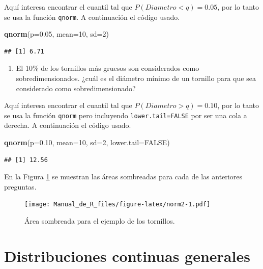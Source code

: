 \documentclass[10pt,]{krantz}
\makeatletter
\newenvironment{Shaded}{\begin{snugshade}}{\end{snugshade}}
\newcommand{\KeywordTok}[1]{\textcolor[rgb]{0.13,0.29,0.53}{\textbf{{#1}}}}
\newcommand{\DataTypeTok}[1]{\textcolor[rgb]{0.13,0.29,0.53}{{#1}}}
\newcommand{\DecValTok}[1]{\textcolor[rgb]{0.00,0.00,0.81}{{#1}}}
\newcommand{\FloatTok}[1]{\textcolor[rgb]{0.00,0.00,0.81}{{#1}}}
\newcommand{\OtherTok}[1]{\textcolor[rgb]{0.56,0.35,0.01}{{#1}}}
\newcommand{\NormalTok}[1]{{#1}}
\providecommand{\tightlist}{%
  \setlength{\itemsep}{0pt}\setlength{\parskip}{0pt}}
\newenvironment{kframe}{%
\medskip{}
\setlength{\fboxsep}{.8em}
 \def\at@end@of@kframe{}%
 \ifinner\ifhmode%
  \def\at@end@of@kframe{\end{minipage}}%
  \begin{minipage}{\columnwidth}%
 \fi\fi%
 \def\FrameCommand##1{\hskip\@totalleftmargin \hskip-\fboxsep
 \colorbox{shadecolor}{##1}\hskip-\fboxsep
     \hskip-\linewidth \hskip-\@totalleftmargin \hskip\columnwidth}%
 \MakeFramed {\advance\hsize-\width
   \@totalleftmargin\z@ \linewidth\hsize
   \@setminipage}}%
 {\par\unskip\endMakeFramed%
 \at@end@of@kframe}
\renewenvironment{Shaded}{\begin{kframe}}{\end{kframe}}
\makeatother
\begin{document}
Aquí interesa encontrar el cuantil tal que \(P(Diametro<q)=0.05\), por
lo tanto se usa la función \texttt{qnorm}. A continuación el código
usado.

\begin{Shaded}
\begin{Highlighting}[]
\KeywordTok{qnorm}\NormalTok{(}\DataTypeTok{p=}\FloatTok{0.05}\NormalTok{, }\DataTypeTok{mean=}\DecValTok{10}\NormalTok{, }\DataTypeTok{sd=}\DecValTok{2}\NormalTok{)}
\end{Highlighting}
\end{Shaded}

\begin{verbatim}
## [1] 6.71
\end{verbatim}

\begin{enumerate}
\def\labelenumi{\arabic{enumi})}
\setcounter{enumi}{3}
\tightlist
\item
  El 10\% de los tornillos más gruesos son considerados como
  sobredimensionados. ¿cuál es el diámetro mínimo de un tornillo para
  que sea considerado como sobredimensionado?
\end{enumerate}

Aquí interesa encontrar el cuantil tal que \(P(Diametro>q)=0.10\), por
lo tanto se usa la función \texttt{qnorm} pero incluyendo
\texttt{lower.tail=FALSE} por ser una cola a derecha. A continuación el
código usado.

\begin{Shaded}
\begin{Highlighting}[]
\KeywordTok{qnorm}\NormalTok{(}\DataTypeTok{p=}\FloatTok{0.10}\NormalTok{, }\DataTypeTok{mean=}\DecValTok{10}\NormalTok{, }\DataTypeTok{sd=}\DecValTok{2}\NormalTok{, }\DataTypeTok{lower.tail=}\OtherTok{FALSE}\NormalTok{)}
\end{Highlighting}
\end{Shaded}

\begin{verbatim}
## [1] 12.56
\end{verbatim}

En la Figura \ref{fig:norm2} se muestran las áreas sombreadas para cada
de las anteriores preguntas.

\begin{figure}[htbp]
\centering
\texttt{[image: Manual\_de\_R\_files/figure-latex/norm2-1.pdf]}
\caption{\label{fig:norm2}Área sombreada para el ejemplo de los tornillos.}
\end{figure}

\section{Distribuciones continuas
generales}\label{distribuciones-continuas-generales}
\end{document}
